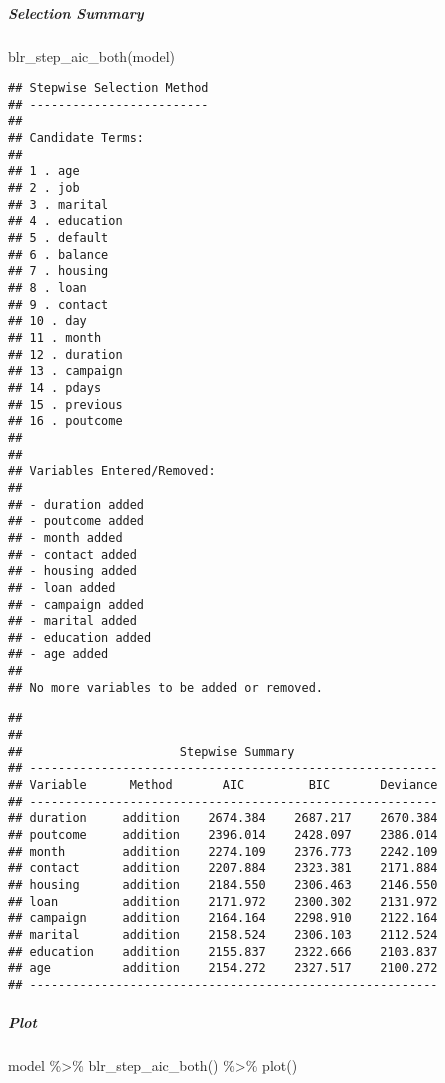 \documentclass[
]{article}
\newenvironment{Shaded}{\begin{snugshade}}{\end{snugshade}}
\newcommand{\FunctionTok}[1]{\textcolor[rgb]{0.00,0.00,0.00}{#1}}
\newcommand{\NormalTok}[1]{#1}
\newcommand{\SpecialCharTok}[1]{\textcolor[rgb]{0.00,0.00,0.00}{#1}}
\begin{document}
\hypertarget{selection-summary}{%
\subparagraph{Selection Summary}\label{selection-summary}}

\begin{Shaded}
\begin{Highlighting}[]
\FunctionTok{blr\_step\_aic\_both}\NormalTok{(model)}
\end{Highlighting}
\end{Shaded}

\begin{verbatim}
## Stepwise Selection Method 
## -------------------------
## 
## Candidate Terms: 
## 
## 1 . age 
## 2 . job 
## 3 . marital 
## 4 . education 
## 5 . default 
## 6 . balance 
## 7 . housing 
## 8 . loan 
## 9 . contact 
## 10 . day 
## 11 . month 
## 12 . duration 
## 13 . campaign 
## 14 . pdays 
## 15 . previous 
## 16 . poutcome 
## 
## 
## Variables Entered/Removed: 
## 
## - duration added 
## - poutcome added 
## - month added 
## - contact added 
## - housing added 
## - loan added 
## - campaign added 
## - marital added 
## - education added 
## - age added 
## 
## No more variables to be added or removed.
\end{verbatim}

\begin{verbatim}
## 
## 
##                      Stepwise Summary                      
## ---------------------------------------------------------
## Variable      Method       AIC         BIC       Deviance 
## ---------------------------------------------------------
## duration     addition    2674.384    2687.217    2670.384 
## poutcome     addition    2396.014    2428.097    2386.014 
## month        addition    2274.109    2376.773    2242.109 
## contact      addition    2207.884    2323.381    2171.884 
## housing      addition    2184.550    2306.463    2146.550 
## loan         addition    2171.972    2300.302    2131.972 
## campaign     addition    2164.164    2298.910    2122.164 
## marital      addition    2158.524    2306.103    2112.524 
## education    addition    2155.837    2322.666    2103.837 
## age          addition    2154.272    2327.517    2100.272 
## ---------------------------------------------------------
\end{verbatim}

\hypertarget{plot-9}{%
\subparagraph{Plot}\label{plot-9}}

\begin{Shaded}
\begin{Highlighting}[]
\NormalTok{model }\SpecialCharTok{\%\textgreater{}\%}
  \FunctionTok{blr\_step\_aic\_both}\NormalTok{() }\SpecialCharTok{\%\textgreater{}\%}
  \FunctionTok{plot}\NormalTok{()}
\end{Highlighting}
\end{Shaded}
\end{document}
